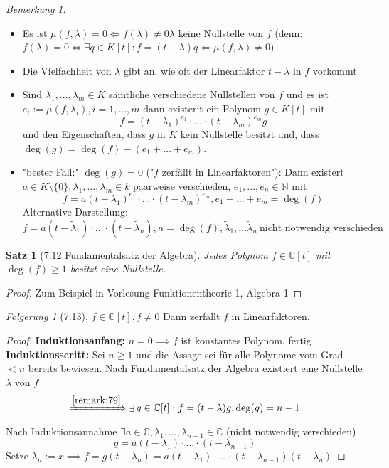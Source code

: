 \documentclass[a4paper]{scrartcl}
\DeclareMathOperator{\Exists}{\exists}
\theoremstyle{definition}
\theoremstyle{plain}
\newtheorem{thm}{Satz}
\theoremstyle{plain}
\theoremstyle{remark}
\newtheorem{remark}{Bemerkung}
\theoremstyle{remark}
\theoremstyle{remark}
\newtheorem{conc}{Folgerung}
\theoremstyle{remark}
\theoremstyle{remark}
\begin{document}
\begin{remark}
\begin{itemize}
\item Es ist $\mu(f,\lambda) = 0 \iff f(\lambda) \neq 0 \lambda$ keine Nullstelle von $f$ (denn: $f(\lambda) = 0 \iff \Exists q\in K[t]: f=(t - \lambda)q \iff \mu(f,\lambda) \neq 0$)
\item Die Vielfachheit von $\lambda$ gibt an, wie oft der Linearfaktor $t - \lambda$ in $f$ vorkommt
\item Sind $\lambda_1,\ldots,\lambda_m \in K$ sämtliche verschiedene Nullstellen von $f$ und es ist $e_i := \mu(f,\lambda_i),i = 1,\ldots,m$ dann existerit ein Polynom $g\in K[t]$ mit
\[f = (t - \lambda_1)^{e_1}\cdot\ldots\cdot(t-\lambda_m)^{e_m}g\]
und den Eigenschaften, dass $g$ in $K$ kein Nullstelle besitzt und, dass $\deg(g) = \deg(f) - (e_1 + \ldots + e_m)$.
\item "bester Fall:" $\deg(g) = 0$ ("$f$ zerfällt in Linearfaktoren"):
Dann existert $a\in K\setminus\{0\}, \lambda_1,\ldots, \lambda_m \in k$ paarweise verschieden, $e_1,\ldots,e_n \in \mathbb{N}$  mit
\[f = a(t - \lambda_1)^{e_1}\cdot\ldots\cdot(t - \lambda_m)^{e_m}, e_1 + \ldots + e_m = \deg(f)\]
Alternative Darstellung:
\[f = a(t - \tilde\lambda_1) \cdot \ldots\cdot(t - \tilde\lambda_n), n = \deg(f), \tilde\lambda_1,\ldots\tilde\lambda_n~\text{nicht notwendig verschieden}\]
\end{itemize}
\end{remark}
\begin{thm}[7.12 Fundamentalsatz der Algebra]
Jedes Polynom $f \in \mathbb{C}[t]$ mit $\deg(f) \geq 1$ besitzt eine Nullstelle.
\end{thm}
\begin{proof}
Zum Beispiel in Vorlesung Funktionentheorie 1, Algebra 1
\end{proof}
\begin{conc}[7.13]
$f\in\mathbb{C}[t], f\neq 0$
Dann zerfällt $f$ in Linearfaktoren.
\end{conc}
\begin{proof}
\textbf{Induktionsanfang:} $n = 0 \implies f$ ist konstantes Polynom, fertig \\
  \textbf{Induktionsscritt:} Sei $n\geq 1$ und die Assage sei für alle Polynome vom Grad $< n$ bereits bewiesen. Nach Fundamentalsatz der Algebra existiert eine Nullstelle $\lambda$ von $f$
\[\xRightarrow{\ref{remark:79}} \Exists g\in \mathbb{C}[t]: f = (t - \lambda)g, \deg(g) = n - 1 \]
Nach Induktionsannahme $\Exists a\in\mathbb{C},\lambda_1,\ldots,\lambda_{n - 1} \in \mathbb{C}$ (nicht notwendig verschieden)
\[g = a(t - \lambda_1)\cdot\ldots\cdot(t - \lambda_{n-1})\]
Setze $\lambda_n := x \implies f = g(t - \lambda_n) = a(t - \lambda_1)\cdot\ldots\cdot(t - \lambda_{n - 1})(t - \lambda_n)$
\end{proof}
\end{document}
